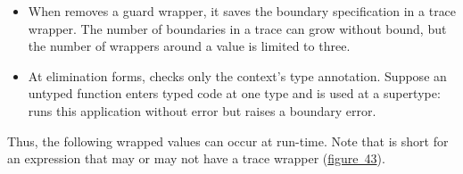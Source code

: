 \documentclass[ twoside,open=right,titlepage,numbers=noenddot,headinclude,%
                footinclude=true,cleardoublepage=empty,abstract=off,
                BCOR=5mm,paper=a4,fontsize=11pt,%
                ngerman,american,%
                parts,pdfspacing]{scrreprt}
\newlength{\stabLeft}
\newcommand{\atItemizeStart}[0]{\addtolength{\stabLeft}{\labelsep}
                                \addtolength{\stabLeft}{\labelwidth}}
\newcommand{\FigureRef}[2]{#1}
\begin{document}
\noindent \begin{itemize}\atItemizeStart

\item When \relax{\aname} removes a guard wrapper, it saves the boundary specification
 in a trace wrapper.
The number of boundaries in a trace can grow without bound, but the
 number of wrappers around a value is limited to three.

\item At elimination forms, \relax{\aname} checks only the context{'}s type annotation.
Suppose an untyped function enters typed code at one type and is
 used at a supertype:
\relax{\aname} runs this application without error but \relax{\fname} raises a boundary error.\end{itemize}

\noindent{}Thus, the following wrapped values can occur at run{-}time.
Note that \relax{$(\ehopt{\sbset}{\sexpr})$} is short for an expression that may or may not have a trace wrapper (\hyperref[t:x28counter_x28x22figurex22_x22figx3aamnesicx2dmetax22x29x29]{figure~\FigureRef{43}{t:x28counter_x28x22figurex22_x22figx3aamnesicx2dmetax22x29x29}}).

\end{document}
